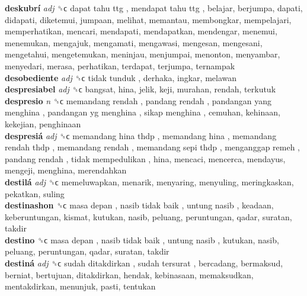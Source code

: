 \textbf{deskubrí} \emph{adj}  ␝ϲ   dapat tahu ttg ,  mendapat tahu ttg , belajar, berjumpa, dapati, didapati, diketemui, jumpaan, melihat, memantau, membongkar, mempelajari, memperhatikan, mencari, mendapati, mendapatkan, mendengar, menemui, menemukan, mengajuk, mengamati, mengawasi, mengesan, mengesani, mengetahui, mengetemukan, meninjau, menjumpai, menonton, menyambar, menyedari, merasa, perhatikan, terdapat, terjumpa, ternampak  \\
\textbf{desobediente} \emph{adj}  ␝ϲ   tidak tunduk , derhaka, ingkar, melawan  \\
\textbf{despresiabel} \emph{adj}  ␝ϲ  bangsat, hina, jelik, keji, murahan, rendah, terkutuk  \\
\textbf{despresio} \emph{n}  ␝ϲ   memandang rendah ,  pandang rendah ,  pandangan yang menghina ,  pandangan yg menghina ,  sikap menghina , cemuhan, kehinaan, kekejian, penghinaan  \\
\textbf{despresiá} \emph{adj}  ␝ϲ   memandang hina thdp ,  memandang hina ,  memandang rendah thdp ,  memandang rendah ,  memandang sepi thdp ,  menganggap remeh ,  pandang rendah ,  tidak mempedulikan , hina, mencaci, mencerca, mendayus, mengeji, menghina, merendahkan  \\
\textbf{destilá} \emph{adj}  ␝ϲ  memeluwapkan, menarik, menyaring, menyuling, meringkaskan, pekatkan, suling  \\
\textbf{destinashon} ␝ϲ   masa depan ,  nasib tidak baik ,  untung nasib , keadaan, keberuntungan, kismat, kutukan, nasib, peluang, peruntungan, qadar, suratan, takdir  \\
\textbf{destino} ␝ϲ   masa depan ,  nasib tidak baik ,  untung nasib , kutukan, nasib, peluang, peruntungan, qadar, suratan, takdir  \\
\textbf{destiná} \emph{adj}  ␝ϲ   sudah ditakdirkan ,  sudah tersurat , bercadang, bermaksud, berniat, bertujuan, ditakdirkan, hendak, kebinasaan, memaksudkan, mentakdirkan, menunjuk, pasti, tentukan  \\
